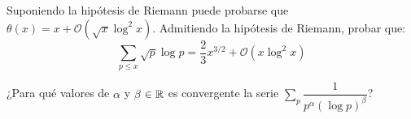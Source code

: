 \documentclass[twoside]{article}
\begin{document}
\begin{ejercicio}{13}
Suponiendo la hipótesis de Riemann puede probarse que $θ(x) = x + \mathcal{O}(\sqrt{x} \log^2x)$. Admitiendo la hipótesis de Riemann, probar que:
\[ \sum_{p≤x} \sqrt{p}\log p = \frac{2}{3} x^{3/2} + \mathcal{O}(x\log^2 x) \]
\end{ejercicio}

\begin{ejercicio}{14}
¿Para qué valores de $α$ y $β$ $\in \mathbb{R}$ es convergente la serie $\sum\limits_p \dfrac{1}{p^α(\log p)^β}$?
\end{ejercicio}
\end{document}
